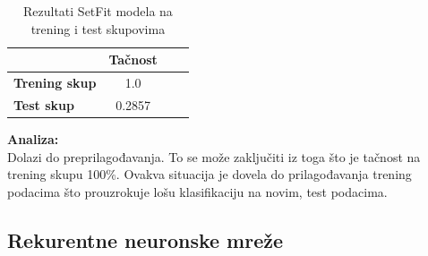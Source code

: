 \documentclass{article}
\begin{document}
\begin{flushleft}
\begin{center}
  \begin{table}[h]
    \centering
    \begin{tabular}{lccc}
      \hline
      & \textbf{Tačnost} \\
      \hline
      \textbf{Trening skup} & 1.0 \\
     \textbf{ Test skup} & 0.2857 \\
      \hline
    \end{tabular}
    \caption*{Rezultati SetFit modela na trening i test skupovima}
    \label{tab:setfit_results}
  \end{table}
\end{center}

\textbf{Analiza:}\\
Dolazi do preprilagođavanja. To se može zaključiti iz toga što je tačnost na trening skupu 100\%. Ovakva situacija je dovela do prilagođavanja trening podacima što prouzrokuje lošu klasifikaciju na novim, test podacima.


\end{flushleft}

\newpage


\subsection{Rekurentne neuronske mreže}
\end{document}
